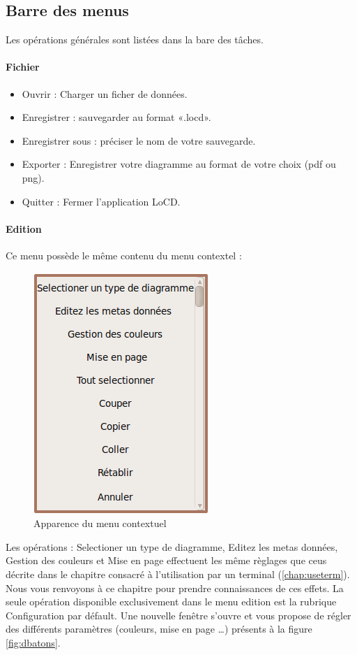 \subsection{Barre des menus}
Les opérations générales sont listées dans la bare des tâches.
 \paragraph{Fichier}
 \begin{itemize}
\item
Ouvrir : Charger un ficher de données.
\item
Enregistrer : sauvegarder au format «.locd».
\item
Enregistrer sous : préciser le nom de votre sauvegarde.
\item
Exporter : Enregistrer votre diagramme au format de votre choix (pdf ou png).
\item
Quitter : Fermer l'application LoCD.
 \end{itemize} 
 
 \paragraph{Edition}
Ce menu possède le même contenu du menu contextel :
  \begin{figure}[htbp]
    \centering
    \includegraphics[scale=0.60]{img/menucont}
    \caption{Apparence du menu contextuel}
    \label{fig:menucont}
  \end{figure}

Les opérations : Selectioner un type de diagramme, Editez les metas données, Gestion des couleurs et Mise en page  effectuent les même règlages que ceus décrite dans le chapitre consacré à  l'utilisation par un terminal (\ref{chap:useterm}). Nous vous renvoyons à ce chapitre pour prendre connaissances de ces effets. La seule opération disponible exclusivement dans le menu edition est la rubrique Configuration par défault. Une nouvelle fenêtre s'ouvre et vous propose de régler des différents paramètres (couleurs, mise en page \dots) présents à la figure \ref{fig:dbatons}. 
